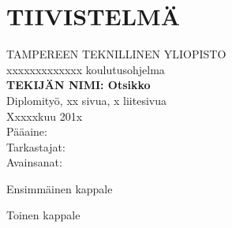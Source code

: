 \setcounter{page}{1} %

\chapter*{TIIVISTELMÄ}
\begin{spacing}{1.0}
\textsf{TAMPEREEN TEKNILLINEN YLIOPISTO}\\
\textsf{xxxxxxxxxxxxx koulutusohjelma}\\
{\bf \textsf{TEKIJÄN NIMI: Otsikko}}\\
\textsf{Diplomityö, xx sivua, x liitesivua}\\
\textsf{Xxxxxkuu 201x}\\
\textsf{Pääaine: }\\
\textsf{Tarkastajat: }\\
\textsf{Avainsanat: }\\
\end{spacing}

\noindent
Ensimmäinen kappale

\noindent
Toinen kappale